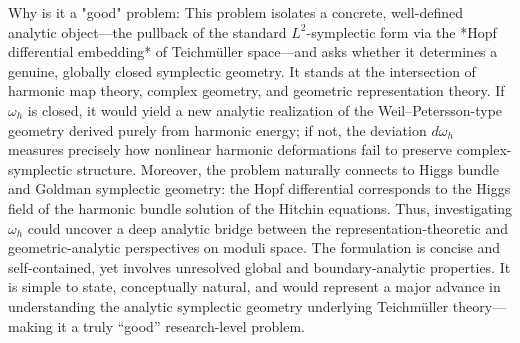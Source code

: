 Why is it a "good" problem:  
This problem isolates a concrete, well-defined analytic object—the pullback of the standard \(L^2\)-symplectic form via the *Hopf differential embedding* of Teichmüller space—and asks whether it determines a genuine, globally closed symplectic geometry. It stands at the intersection of harmonic map theory, complex geometry, and geometric representation theory.  
If \(\omega_h\) is closed, it would yield a new analytic realization of the Weil–Petersson-type geometry derived purely from harmonic energy; if not, the deviation \(d\omega_h\) measures precisely how nonlinear harmonic deformations fail to preserve complex-symplectic structure.  
Moreover, the problem naturally connects to Higgs bundle and Goldman symplectic geometry: the Hopf differential corresponds to the Higgs field of the harmonic bundle solution of the Hitchin equations. Thus, investigating \(\omega_h\) could uncover a deep analytic bridge between the representation-theoretic and geometric-analytic perspectives on moduli space.  
The formulation is concise and self-contained, yet involves unresolved global and boundary-analytic properties. It is simple to state, conceptually natural, and would represent a major advance in understanding the analytic symplectic geometry underlying Teichmüller theory—making it a truly “good” research-level problem.